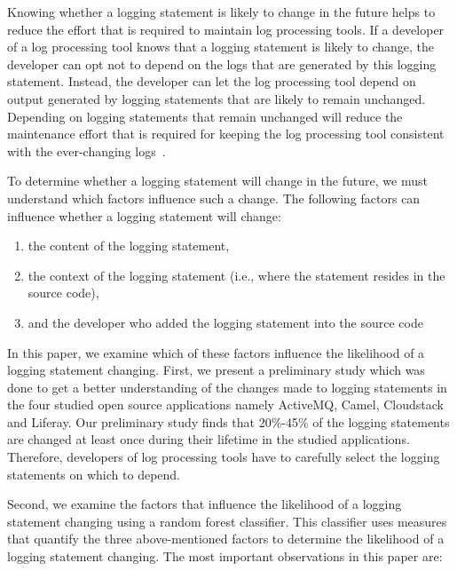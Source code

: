 Knowing whether a logging statement is likely to change in the future helps to reduce the effort that is required to maintain log processing tools. If a developer of a log processing tool knows that a logging statement is likely to change, the developer can opt not to depend on the logs that are generated by this logging statement. Instead, the developer can let the log processing tool depend on output generated by logging statements that are likely to remain unchanged. Depending on logging statements that remain unchanged will reduce the maintenance effort that is required for keeping the log processing tool consistent with the ever-changing logs~\cite{shang2014exploratory,IanWCRE}. 


To determine whether a logging statement will change in the future, we must understand which factors influence such a change. The following factors can influence whether a logging statement will change:
\begin{enumerate} 
\item the content of the logging statement,
\item the context of the logging statement (i.e., where the statement resides in the source code),
\item and the developer who added the logging statement into the source code
\end{enumerate}
In this paper, we examine which of these factors influence the likelihood of a logging statement changing. First, we present a preliminary study which was done to get a better understanding of the changes made to logging statements in the four studied open source applications namely ActiveMQ, Camel, Cloudstack and Liferay. Our preliminary study finds that 20\%-45\% of the logging statements are changed at least once during their lifetime in the studied applications. Therefore, developers of log processing tools have to carefully select the logging statements on which to depend. 

Second, we examine the factors that influence the likelihood of a logging statement changing using a random forest classifier. This classifier uses measures that quantify the three above-mentioned factors to determine the likelihood of a logging statement changing.
The most important observations in this paper are:



